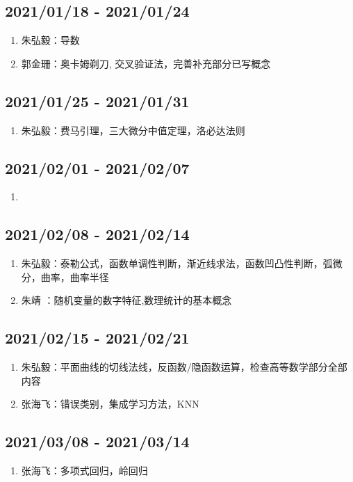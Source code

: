 \documentclass[a4paper,12pt]{article}
\begin{document}
\subsection{2021/01/18 - 2021/01/24}
\begin{enumerate}
    \item 朱弘毅：导数
    \item 郭金珊：奥卡姆剃刀, 交叉验证法，完善补充部分已写概念
\end{enumerate}

\subsection{2021/01/25 - 2021/01/31}
\begin{enumerate}
    \item 朱弘毅：费马引理，三大微分中值定理，洛必达法则
\end{enumerate}

\subsection{2021/02/01 - 2021/02/07}
\begin{enumerate}
    \item
\end{enumerate}

\subsection{2021/02/08 - 2021/02/14}
\begin{enumerate}
    \item 朱弘毅：泰勒公式，函数单调性判断，渐近线求法，函数凹凸性判断，弧微分，曲率，曲率半径
    \item 朱靖 ：随机变量的数字特征,数理统计的基本概念
\end{enumerate}

\subsection{2021/02/15 - 2021/02/21}
\begin{enumerate}
    \item 朱弘毅：平面曲线的切线法线，反函数/隐函数运算，检查高等数学部分全部内容
    \item 张海飞：错误类别，集成学习方法，KNN
\end{enumerate}

\subsection{2021/03/08 - 2021/03/14}
\begin{enumerate}
    \item 张海飞：多项式回归，岭回归
\end{enumerate}
\end{document}
